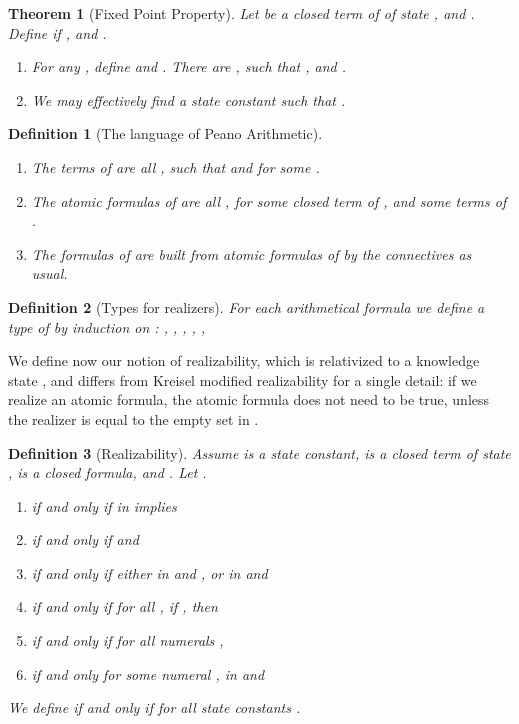\documentclass[copyright,creativecommons]{eptcs}
\newtheorem{theorem}{Theorem}
\newtheorem{definition}{Definition}
\begin{document}
\begin{theorem}[Fixed Point Property]\label{Fixed Point Property}
Let  be a closed term of  of state , and . Define  if , and .
\begin{enumerate}
\item
For any , define  and . There are ,  such that ,  and .
\item
We may effectively find a state constant  such that .
\end{enumerate}
\end{theorem}


\begin{definition}[The language  of Peano Arithmetic] \label{definition-extendedarithmetic} 

\begin{enumerate}

\item
The terms of  are all , such that  and  for some .

\item
The atomic formulas of  are all , for some  {\em closed term of }, and some terms  of .


\item
The formulas of  are built from atomic formulas of  by the connectives  as usual.
\end{enumerate}


\end{definition}


\begin{definition}[Types for realizers]
\label{definition-TypesForRealizers} For each
arithmetical formula  we define a type  of  by
induction on :
,
,
,
,
,

\end{definition}
We define now our notion of realizability, which is relativized to a knowledge state , and differs from Kreisel modified realizability for a single detail: if we realize an atomic formula, the atomic formula does not need to be true, unless the realizer is equal to the empty set in .
\begin{definition}[Realizability]
\label{lemma-IndexedRealizabilityAndRealizability}
Assume  is a state constant,  is a closed term of state ,  is a closed formula, and . Let .

\begin{enumerate}
\item
 if and only if  in  implies



\item
 if and only if  and 

\item
  if and only if either  in  and , or  in  and 

\item
 if and only if for all , if ,
then 

\item
 if and only if for all numerals ,

\item

 if and only for some numeral ,  in  and 
\end{enumerate}
We define  if and only if  for all state constants .
\end{definition}
\end{document}
